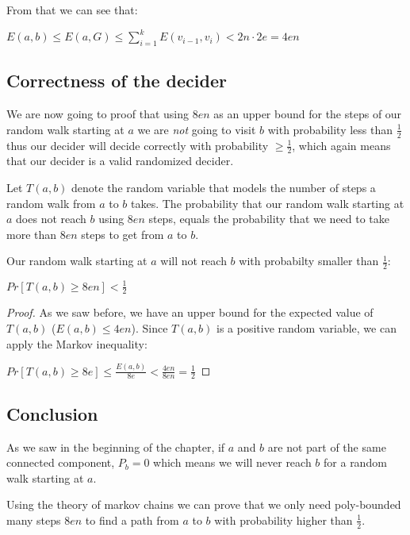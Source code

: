 From that we can see that:

$E(a, b) \leq E(a, G) \leq \sum_{i=1}^{k} E(v_{i-1}, v_i) < 2n \cdot 2e = 4en$

\subsection{Correctness of the
decider}\label{correctness-of-the-decider}

We are now going to proof that using $8en$ as an upper bound for the
steps of our random walk starting at $a$ we are \emph{not} going to
visit $b$ with probability less than $\frac{1}{2}$ thus our decider will
decide correctly with probability $\geq \frac{1}{2}$, which again means
that our decider is a valid randomized decider.

Let $T(a, b)$ denote the random variable that models the number of steps
a random walk from $a$ to $b$ takes. The probability that our random
walk starting at $a$ does not reach $b$ using $8en$ steps, equals the
probability that we need to take more than $8en$ steps to get from $a$
to $b$.

\vspace{0.5cm}

\begin{thm}
Our random walk starting at $a$ will not reach $b$ with probabilty smaller than $\frac{1}{2}$:

$Pr[T(a, b) \geq 8en] < \frac{1}{2}$
\end{thm}

\begin{proof}

As we saw before, we have an upper bound for the expected value of $T(a, b)$ ($E(a, b) \leq 4en$).
Since $T(a, b)$ is a positive random variable, we can apply the Markov inequality:

$Pr[T(a, b) \geq 8e] \leq \frac{E(a, b)}{8e} < \frac{4en}{8en} = \frac{1}{2}$
\end{proof}

\subsection{Conclusion}\label{conclusion}

As we saw in the beginning of the chapter, if $a$ and $b$ are not part
of the same connected component, $P_b = 0$ which means we will never
reach $b$ for a random walk starting at $a$.

Using the theory of markov chains we can prove that we only need
poly-bounded many steps $8en$ to find a path from $a$ to $b$ with
probability higher than $\frac{1}{2}$.

